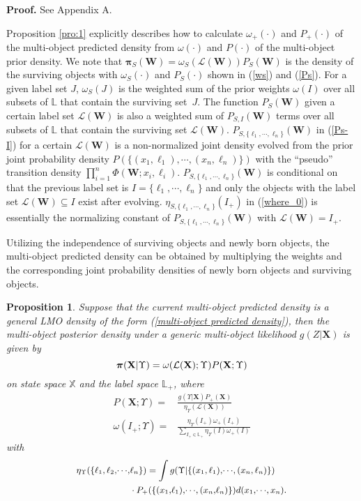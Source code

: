 \documentclass[journal]{IEEEtran}
\newcommand{\bW}{{\mathbf W}}
\newcommand{\bX}{{\mathbf X}}
\newcommand{\bpi}{{\boldsymbol\pi}}
\newtheorem{Pro}{Proposition}
\newcommand{\proproof}[1]{\noindent\textbf{Proof. } See Appendix #1.}
\begin{document}
{\proproof{A}

Proposition \ref{pro:1} explicitly describes how to calculate  $\omega_+(\cdot)$ and $P_+(\cdot)$  of the  multi-object predicted density from  $\omega(\cdot)$ and $P(\cdot)$ of the multi-object  prior  density. We note that $\bpi_S(\bW)=\omega_S(\mathcal{L}(\bW))P_S(\bW)$ is  the density of the surviving objects with $\omega_S(\cdot)$ and $P_S(\cdot)$  shown in (\ref{ws}) and (\ref{Ps}).  For a  given label set $J$, $\omega_S(J)$ is the weighted sum  of the prior weights $\omega(I)$ over all subsets of $\mathbb{L}$ that contain the surviving set~$J$.  
The function $P_S(\bW)$ given a certain  label set $\mathcal{L}(\bW)$  is also a weighted sum of $P_{S,I}(\bW)$ terms over all subsets of $\mathbb{L}$  that contain the surviving set $\mathcal{L}(\bW)$. 
$P_{S,\{\ell_1,\cdots,\ell_n\}}(\bW)$  in (\ref{Ps-I})  for a certain $\mathcal{L}(\bW)$ is a non-normalized joint density evolved from the prior joint probability density $P(\{(x_1,\ell_1),\cdots,(x_n,\ell_n)\})$  with the ``pseudo'' transition density $\prod_{i=1}^n \Phi(\bW;x_i,\ell_i)$.  $P_{S,\{\ell_1,\cdots,\ell_n\}}(\bW)$ is conditional on that the previous label set is $I=\{\ell_1,\cdots,\ell_n\}$ and  only the objects with the label set $\mathcal{L}(\bW)\subseteq I$ exist after evolving. $\eta_{S,\{\ell_1,\cdots,\ell_n\}}(I_+)$ in (\ref{where_0}) is essentially the normalizing constant of $P_{S,\{\ell_1,\cdots,\ell_n\}}(\bW)$ with $\mathcal{L}(\bW)=I_+$.

Utilizing the independence of surviving objects and newly born objects, the multi-object predicted density can be obtained by multiplying   the weights  and the corresponding joint probability densities of newly born objects and surviving objects.
\begin{Pro}\label{pro:2}
Suppose that the current multi-object predicted density is a general LMO density of the form (\ref{multi-object predicted density}), then the multi-object posterior density under a generic multi-object likelihood $g(Z|\bX)$ is given by
\begin{equation}\label{posterior}
{\small
\bpi(\bX|\Upsilon)=\omega(\mathcal{L}(\bX);\Upsilon)P(\bX;\Upsilon)}
\end{equation}
on state space $\mathbb{X}$ and the label space ${\mathbb{L}}_+$,
where
\begin{align}\label{where_p}
   P(\bX;\Upsilon)=&\frac{g(\Upsilon|\bX)P_+(\bX)}{\eta_{\Upsilon}(\mathcal{L}(\bX))}\\
  \label{where_w} \omega(I_{+};\Upsilon)=&\frac{\eta_{\Upsilon}(I_{+})\omega_+(I_{+})}{\sum_{I_{+}\in\mathbb{L}_+}\eta_\Upsilon(I)\omega_+(I)}
 \end{align} 
with
  \begin{equation}
  {\small
    \begin{split}
    \label{where_eta} \eta_{\Upsilon}(\{\ell_1,\ell_2,\!\cdots\!,&\ell_n\})= \int g(\Upsilon|\{(x_1,\ell_1),\!\cdots\!,(x_n,\ell_n)\})\\&
\cdot P_+(\{(x_1,\!\ell_1),\!\cdots\!,(x_n,\!\ell_n)\})d(x_1,\!\cdots\!,x_n).
\end{split}}
\end{equation} 
\end{Pro}

}
\end{document}
